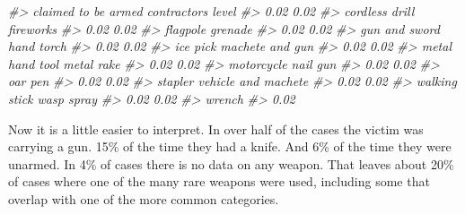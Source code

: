 \documentclass[
  12pt,
]{book}
\newenvironment{Shaded}{\begin{snugshade}}{\end{snugshade}}
\newcommand{\CommentTok}[1]{\textcolor[rgb]{0.37,0.37,0.37}{\textit{#1}}}
\begin{document}
\begin{Shaded}
\begin{Highlighting}[]
\CommentTok{\#\textgreater{}              claimed to be armed               contractor\textquotesingle{}s level }
\CommentTok{\#\textgreater{}                             0.02                             0.02 }
\CommentTok{\#\textgreater{}                   cordless drill                        fireworks }
\CommentTok{\#\textgreater{}                             0.02                             0.02 }
\CommentTok{\#\textgreater{}                         flagpole                          grenade }
\CommentTok{\#\textgreater{}                             0.02                             0.02 }
\CommentTok{\#\textgreater{}                    gun and sword                       hand torch }
\CommentTok{\#\textgreater{}                             0.02                             0.02 }
\CommentTok{\#\textgreater{}                         ice pick                  machete and gun }
\CommentTok{\#\textgreater{}                             0.02                             0.02 }
\CommentTok{\#\textgreater{}                  metal hand tool                       metal rake }
\CommentTok{\#\textgreater{}                             0.02                             0.02 }
\CommentTok{\#\textgreater{}                       motorcycle                         nail gun }
\CommentTok{\#\textgreater{}                             0.02                             0.02 }
\CommentTok{\#\textgreater{}                              oar                              pen }
\CommentTok{\#\textgreater{}                             0.02                             0.02 }
\CommentTok{\#\textgreater{}                          stapler              vehicle and machete }
\CommentTok{\#\textgreater{}                             0.02                             0.02 }
\CommentTok{\#\textgreater{}                    walking stick                       wasp spray }
\CommentTok{\#\textgreater{}                             0.02                             0.02 }
\CommentTok{\#\textgreater{}                           wrench }
\CommentTok{\#\textgreater{}                             0.02}
\end{Highlighting}
\end{Shaded}

Now it is a little easier to interpret. In over half of the cases the victim was carrying a gun. 15\% of the time they had a knife. And 6\% of the time they were unarmed. In 4\% of cases there is no data on any weapon. That leaves about 20\% of cases where one of the many rare weapons were used, including some that overlap with one of the more common categories.
\end{document}
